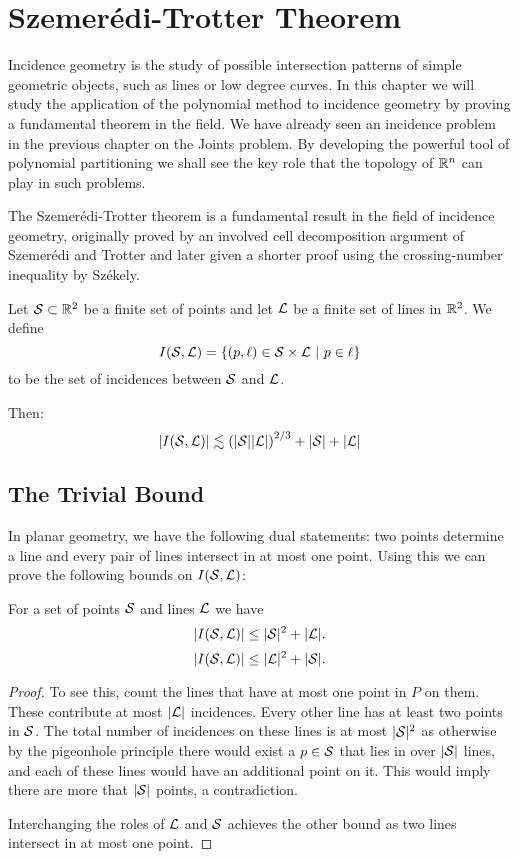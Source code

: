 \chapter{Szemerédi-Trotter Theorem \label{chap:trotter}}


Incidence geometry is the study of possible intersection patterns of simple geometric objects, such as lines or low degree curves. In this chapter we will study the application of the polynomial method to incidence geometry by proving a fundamental theorem in the field.
We have already seen an incidence problem in the previous chapter on the Joints problem. 
By developing the powerful tool of polynomial partitioning we shall see the key role that the topology of $\mathbb R^n$ can play in such problems.


The Szemerédi-Trotter theorem is a fundamental result in the field of incidence geometry, originally proved by an involved cell decomposition argument
of Szemerédi and Trotter and later given a shorter proof using the crossing-number inequality by Székely. 
\begin{theorem}
    Let $\mathcal S \subset\mathbb R^2$ be a finite set of points and
    let $\mathcal L$ be a finite set of lines in $\mathbb R^2$. We define 
    \[I(\mathcal S,\mathcal L) = \{(p, \ell) \in \mathcal S \times \mathcal L \ | \ p \in \ell\}\] 
    to be the set of incidences between $\mathcal S$ and $\mathcal L$. 
   
    Then:
    \[
        |I(\mathcal S, \mathcal L)| \lesssim \left(|\mathcal S||\mathcal L|\right)^{2/3} + |\mathcal S| + |\mathcal L|
    \]
    \label{thm:S-T}
\end{theorem}

\section{The Trivial Bound}
In planar geometry, we have the following dual statements: two points determine a line and every pair of lines intersect in at most one point. 
Using this we can prove the following bounds on $I(\mathcal S,\mathcal L)$:
\begin{lemma}
    For a set of points $\mathcal S$ and lines $\mathcal L$ we have \label{thm:trivial-ST-bounds}
    \[|I(\mathcal S,\mathcal L)| \leq |\mathcal S|^2 + |\mathcal L|. \]
    \[|I(\mathcal S,\mathcal L)| \leq |\mathcal L|^2 + |\mathcal S|. \]
\end{lemma}
\begin{proof}

To see this, count the lines that have at most one point in $P$ on them. These contribute at most $|\mathcal L|$ incidences.
Every other line has at least two points in $\mathcal S$. The total number of incidences on these lines is at most $|\mathcal S|^2$
as otherwise by the pigeonhole principle there would exist a $p\in \mathcal S$ that lies in over $|\mathcal S|$ lines, and each of these lines would have an additional 
point on it. This would imply there are more that $|\mathcal S|$ points, a contradiction. 

Interchanging the roles of $\mathcal L$ and $\mathcal S$ achieves the other bound as two lines intersect in at most one point.
\end{proof}

